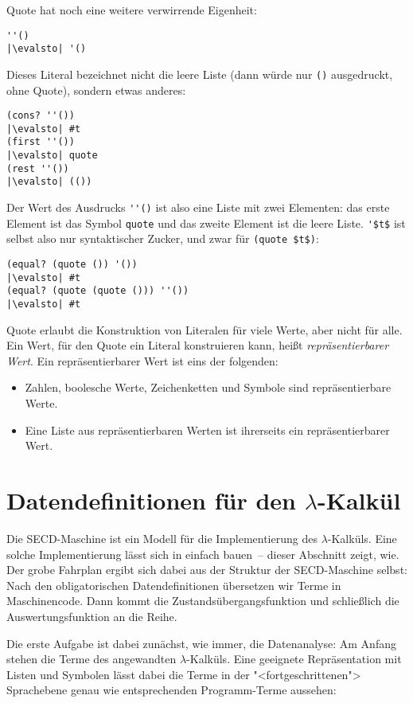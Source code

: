Quote hat noch eine weitere verwirrende Eigenheit:
%
\begin{lstlisting}
''()
|\evalsto| '()
\end{lstlisting}
%
Dieses Literal bezeichnet nicht die leere Liste (dann würde nur
\lstinline{()} ausgedruckt, ohne Quote), sondern etwas anderes:
%
\begin{lstlisting}
(cons? ''())
|\evalsto| #t
(first ''())
|\evalsto| quote
(rest ''())
|\evalsto| (())
\end{lstlisting}
%
Der Wert des Ausdrucks \verb|''()| ist also eine Liste mit zwei
Elementen: das erste Element ist das Symbol \lstinline{quote} und das
zweite Element ist die leere Liste.  \lstinline{'$t$}
ist selbst also nur syntaktischer Zucker, und zwar für
\lstinline{(quote $t$)}:
%
\begin{lstlisting}
(equal? (quote ()) '())
|\evalsto| #t
(equal? (quote (quote ())) ''())
|\evalsto| #t
\end{lstlisting}
%
Quote erlaubt die Konstruktion von Literalen für viele Werte, aber
nicht für alle.  Ein Wert, für den Quote ein Literal konstruieren kann,
heißt \textit{repräsentierbarer
  Wert}.  Ein repräsentierbarer Wert ist
eins der folgenden:
%
\begin{itemize}
\item Zahlen, boolesche Werte, Zeichenketten und Symbole sind
  repräsentierbare Werte.
\item Eine Liste aus repräsentierbaren Werten ist ihrerseits ein
  repräsentierbarer Wert. 
\end{itemize}

\section{Datendefinitionen für den $\lambda$-Kalkül}
\label{sec:datendefinitionen-lambda}

Die SECD-Maschine ist ein Modell für die Implementierung des
$\lambda$-Kalküls.  Eine solche Implementierung lässt sich in einfach
bauen~-- dieser Abschnitt zeigt, wie.  Der grobe Fahrplan ergibt sich
dabei aus der Struktur der SECD-Maschine selbst: Nach den
obligatorischen Datendefinitionen übersetzen wir Terme in
Maschinencode.  Dann kommt die Zustandsübergangsfunktion und
schließlich die Auswertungsfunktion an die Reihe.

Die erste Aufgabe ist dabei zunächst, wie immer, die Datenanalyse: Am
Anfang stehen die Terme des angewandten $\lambda$-Kalküls.  Eine
geeignete Repräsentation mit Listen und Symbolen lässt dabei die Terme
in der "<fortgeschrittenen"> Sprachebene genau wie entsprechenden
Programm-Terme aussehen:

